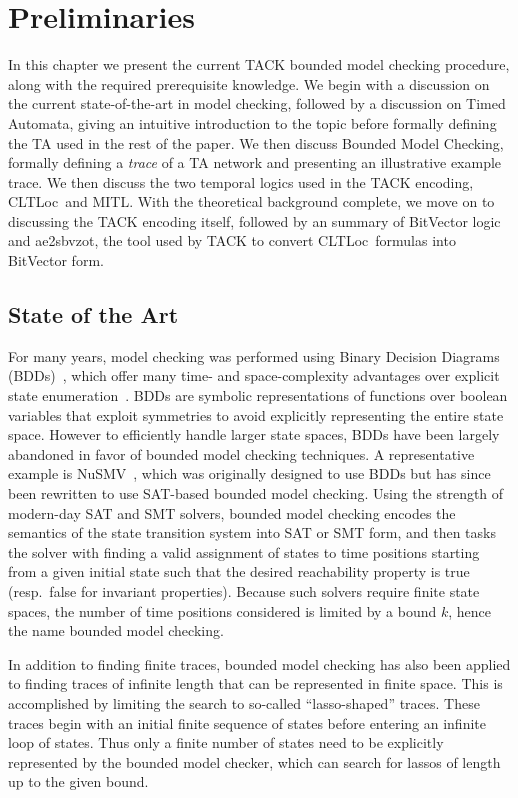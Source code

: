 \documentclass[a4paper,11pt]{report}
\theoremstyle{definition}
\newcommand{\cltloc}{CLTLoc}
\newcommand{\aez}{ae2sbvzot}
\begin{document}
\chapter{Preliminaries}\label{prelims}

In this chapter we present the current TACK bounded model checking procedure,
along with the required prerequisite knowledge. We begin with a discussion on
the current state-of-the-art in model checking, followed by a discussion on
Timed Automata, giving an intuitive introduction to the topic before formally
defining the TA used in the rest of the paper. We then discuss Bounded Model
Checking, formally defining a \emph{trace} of a TA network and presenting an
illustrative example trace. We then discuss the two temporal logics used in the
TACK encoding, \cltloc\ and MITL\@. With the theoretical background complete, we
move on to discussing the TACK encoding itself, followed by an summary of
BitVector logic and \aez, the tool used by TACK to convert \cltloc\ formulas
into BitVector form.

\section{State of the Art}\label{stateoftheart}


For many years, model checking was performed using Binary Decision Diagrams
(BDDs)~\cite{bryant86}, which offer many time- and space-complexity advantages
over explicit state enumeration~\cite{burch92}. BDDs are symbolic
representations of functions over boolean variables that exploit symmetries to
avoid explicitly representing the entire state space. However to
efficiently handle larger state spaces, BDDs have been largely abandoned in
favor of bounded model checking techniques. A representative example is
NuSMV~\cite{cimatti02}, which was originally designed to use BDDs but has since
been rewritten to use SAT-based bounded model checking. Using the strength of
modern-day SAT and SMT solvers, bounded model checking encodes the semantics of
the state transition system into SAT or SMT form, and then tasks the solver with
finding a valid assignment of states to time positions starting from a given
initial state such that the desired reachability property is true (resp.\ false
for invariant properties). Because such solvers require finite state spaces, the
number of time positions considered is limited by a bound $k$, hence the name
bounded model checking.

In addition to finding finite traces, bounded model checking has also been
applied to finding traces of infinite length that can be represented in finite
space. This is accomplished by limiting the search to so-called ``lasso-shaped''
traces. These traces begin with an initial finite sequence of states before
entering an infinite loop of states. Thus only a finite number of states need to
be explicitly represented by the bounded model checker, which can search for
lassos of length up to the given bound.
\end{document}

